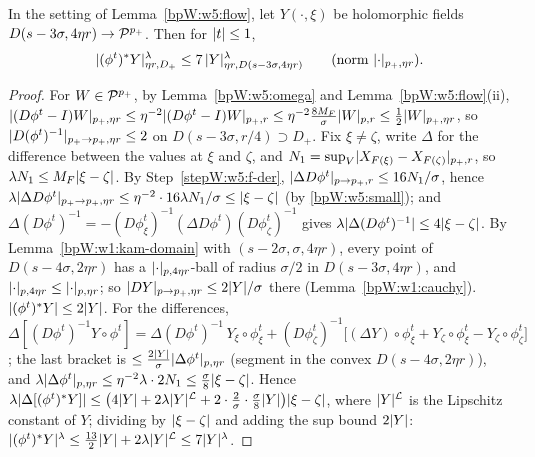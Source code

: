 \begin{lemma}\label{bpW:w5:pullback}
In the setting of Lemma~\ref{bpW:w5:flow}, let $Y(\cdot,\xi)$ be holomorphic fields $D(s-3\sigma,4\eta r)\to\mathcal P^{p_+}$.
Then for $\lvert t\rvert\le1$,
\[\lvert (\phi^t)^*Y\rvert^\lambda_{\eta r,D_+}\le7\,\lvert Y\rvert^\lambda_{\eta r,D(s-3\sigma,4\eta r)}\qquad(\text{norm }\lvert \cdot\rvert_{p_+,\eta r}).\]
\end{lemma}
\begin{proof}
\label{stepW:w5:p-inv} For $W\in\mathcal P^{p_+}$, by Lemma~\ref{bpW:w5:omega} and
Lemma~\ref{bpW:w5:flow}(ii),
$\lvert (D\phi^t-I)W\rvert_{p_+,\eta r}\le\eta^{-2}\lvert (D\phi^t-I)W\rvert_{p_+,r}\le\eta^{-2}\frac{8M_F}\sigma\lvert W\rvert_{p,r}\le\frac12\lvert W\rvert_{p_+,\eta r}$,
so $\lvert D(\phi^t)^{-1}\rvert_{p_+\to p_+,\eta r}\le2$ on $D(s-3\sigma,r/4)\supset D_+$. Fix $\xi\ne\zeta$, write $\Delta$ for the
difference between the values at $\xi$ and $\zeta$, and $N_1=\sup_V\lvert X_{F(\xi)}-X_{F(\zeta)}\rvert_{p_+,r}$, so
$\lambda N_1\le M_F\lvert \xi-\zeta\rvert$. By Step~\ref{stepW:w5:f-der}, $\lvert \Delta D\phi^t\rvert_{p\to p_+,r}\le16N_1/\sigma$, hence
$\lambda\lvert \Delta D\phi^t\rvert_{p_+\to p_+,\eta r}\le\eta^{-2}\cdot16\lambda N_1/\sigma\le\lvert \xi-\zeta\rvert$ (by \eqref{bpW:w5:small}); and
$\Delta(D\phi^t)^{-1}=-(D\phi^t_\xi)^{-1}(\Delta D\phi^t)(D\phi^t_\zeta)^{-1}$ gives $\lambda\lvert \Delta(D\phi^t)^{-1}\rvert\le4\lvert \xi-\zeta\rvert$.
\label{stepW:w5:p-dy} By Lemma~\ref{bpW:w1:kam-domain} with $(s-2\sigma,\sigma,4\eta r)$, every
point of $D(s-4\sigma,2\eta r)$ has a $\lvert \cdot\rvert_{p,4\eta r}$-ball of radius $\sigma/2$ in $D(s-3\sigma,4\eta r)$, and
$\lvert \cdot\rvert_{p,4\eta r}\le\lvert \cdot\rvert_{p,\eta r}$; so $\lvert DY\rvert_{p\to p_+,\eta r}\le2\lvert Y\rvert/\sigma$ there (Lemma~\ref{bpW:w1:cauchy}).
\label{stepW:w5:p-ass} $\lvert (\phi^t)^*Y\rvert\le2\lvert Y\rvert$. For the differences,
$\Delta[(D\phi^t)^{-1}Y\circ\phi^t]=\Delta(D\phi^t)^{-1}\,Y_\xi\circ\phi^t_\xi+(D\phi^t_\zeta)^{-1}\bigl[(\Delta Y)\circ\phi^t_\xi+Y_\zeta\circ\phi^t_\xi-Y_\zeta\circ\phi^t_\zeta\bigr]$;
the last bracket is $\le\frac{2\lvert Y\rvert}\sigma\lvert \Delta\phi^t\rvert_{p,\eta r}$ (segment in the convex $D(s-4\sigma,2\eta r)$), and
$\lambda\lvert \Delta\phi^t\rvert_{p,\eta r}\le\eta^{-2}\lambda\cdot2N_1\le\frac\sigma8\lvert \xi-\zeta\rvert$. Hence
$\lambda\lvert \Delta[(\phi^t)^*Y]\rvert\le\bigl(4\lvert Y\rvert+2\lambda\lvert Y\rvert^{\mathcal L}+2\cdot\frac2\sigma\cdot\frac\sigma8\lvert Y\rvert\bigr)\lvert \xi-\zeta\rvert$, where
$\lvert Y\rvert^{\mathcal L}$ is the Lipschitz constant of $Y$; dividing by $\lvert \xi-\zeta\rvert$ and adding the sup bound $2\lvert Y\rvert$:
$\lvert (\phi^t)^*Y\rvert^\lambda\le\frac{13}2\lvert Y\rvert+2\lambda\lvert Y\rvert^{\mathcal L}\le7\lvert Y\rvert^\lambda$.
\end{proof}

